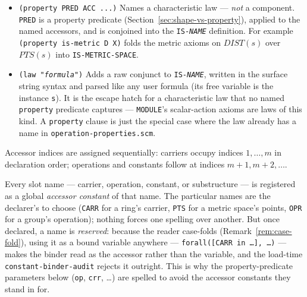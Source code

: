 \begin{itemize}
\item \texttt{(property PRED ACC ...)}
  Names a characteristic law --- \emph{not} a component.  \texttt{PRED}
  is a property predicate (Section~\ref{sec:shape-vs-property}), applied
  to the named accessors, and is conjoined into the
  \texttt{IS-\textit{NAME}} definition.  For example
  \texttt{(property is-metric D X)} folds the metric axioms on
  $\mathit{DIST}(s)$ over $\mathit{PTS}(s)$ into \texttt{IS-METRIC-SPACE}.

\item \texttt{(law "\textit{formula}")}
  Adds a raw conjunct to \texttt{IS-\textit{NAME}}, written in the surface
  string syntax and parsed like any user formula (its free variable is the
  instance \texttt{s}).  It is the escape hatch for a characteristic law that no
  named \texttt{property} predicate captures --- \texttt{MODULE}'s scalar-action
  axioms are laws of this kind.  A \texttt{property} clause is just the special
  case where the law already has a name in \texttt{operation-properties.scm}.

\end{itemize}

Accessor indices are assigned sequentially: carriers occupy indices
$1, \ldots, m$ in declaration order; operations and constants follow
at indices $m+1, m+2, \ldots$.

Every slot name --- carrier, operation, constant, or substructure --- is
registered as a global \emph{accessor constant} of that name.  The
particular names are the declarer's to choose (\texttt{CARR} for a ring's
carrier, \texttt{PTS} for a metric space's points, \texttt{OPR} for a
group's operation); nothing forces one spelling over another.  But once
declared, a name is \emph{reserved}: because the reader case-folds
(Remark~\ref{rem:case-fold}), using it as a bound variable anywhere ---
\texttt{forall([CARR in \ldots], \ldots)} --- makes the binder read as the
accessor rather than the variable, and the load-time
\texttt{constant-binder-audit} rejects it outright.  This is why the
property-predicate parameters below (\texttt{op}, \texttt{crr}, \ldots)
are spelled to avoid the accessor constants they stand in for.

